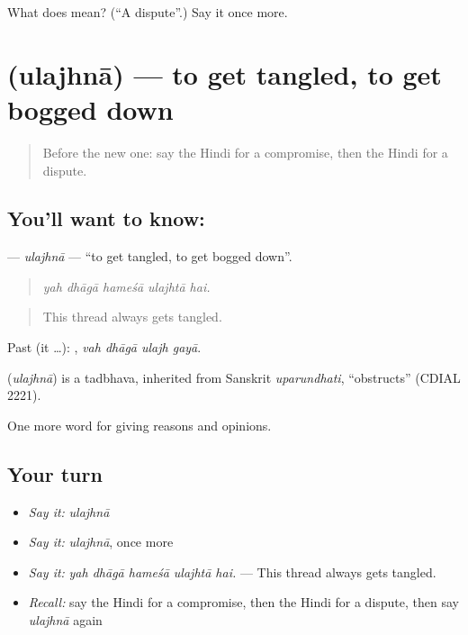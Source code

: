 \begin{tcolorbox}[breakable,colback=teal!4,colframe=teal!35!black,title={Before you move on}]
What does  mean? (\textquotedblleft{}A dispute\textquotedblright{}.) Say it once more.
\end{tcolorbox}
\section[\texorpdfstring{\hi{उलझना} (ulajhnā)}{उलझना (ulajhnā)}]{ (ulajhnā) — to get tangled, to get bogged down}

\label{lesson:HI-C359-ulajhna}



\begin{quote}
Before the new one: say the Hindi for a compromise, then the Hindi for a dispute.
\end{quote}

\subsection*{You'll want to know: }
\textbf{} — \emph{ulajhnā} — \textquotedblleft{}to get tangled, to get bogged down\textquotedblright{}.

\begin{quote}
    
\end{quote}

\begin{quote}
\emph{yah dhāgā hameśā ulajhtā hai.}
\end{quote}

\begin{quote}
This thread always gets tangled.
\end{quote}

Past (it …):    , \emph{vah dhāgā ulajh gayā}.

\begin{cousinweb}
\textbf{} (\emph{ulajhnā}) is a tadbhava, inherited from Sanskrit \emph{uparundhati}, \textquotedblleft{}obstructs\textquotedblright{} (CDIAL 2221).
\end{cousinweb}

\begin{grammarlens}[title={What you've built}]
One more word for giving reasons and opinions.
\end{grammarlens}

\subsection*{Your turn}
\begin{itemize}
\raggedright
  \item \emph{Say it:} \emph{ulajhnā}
  \item \emph{Say it:} \emph{ulajhnā}, once more
  \item \emph{Say it:} \emph{yah dhāgā hameśā ulajhtā hai.} — This thread always gets tangled.
  \item \emph{Recall:} say the Hindi for a compromise, then the Hindi for a dispute, then say \emph{ulajhnā} again
\end{itemize}

